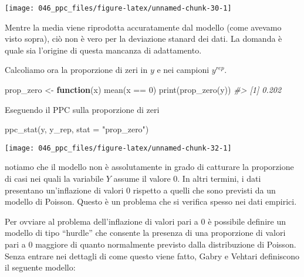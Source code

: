 \documentclass[
]{memoir}
\newenvironment{Shaded}{\begin{snugshade}}{\end{snugshade}}
\newcommand{\AttributeTok}[1]{\textcolor[rgb]{0.77,0.63,0.00}{#1}}
\newcommand{\CommentTok}[1]{\textcolor[rgb]{0.56,0.35,0.01}{\textit{#1}}}
\newcommand{\ControlFlowTok}[1]{\textcolor[rgb]{0.13,0.29,0.53}{\textbf{#1}}}
\newcommand{\DecValTok}[1]{\textcolor[rgb]{0.00,0.00,0.81}{#1}}
\newcommand{\FunctionTok}[1]{\textcolor[rgb]{0.00,0.00,0.00}{#1}}
\newcommand{\NormalTok}[1]{#1}
\newcommand{\OtherTok}[1]{\textcolor[rgb]{0.56,0.35,0.01}{#1}}
\newcommand{\SpecialCharTok}[1]{\textcolor[rgb]{0.00,0.00,0.00}{#1}}
\newcommand{\StringTok}[1]{\textcolor[rgb]{0.31,0.60,0.02}{#1}}
\theoremstyle{definition}
\theoremstyle{definition}
\theoremstyle{definition}
\theoremstyle{definition}
\theoremstyle{remark}
\begin{document}
\begin{center}\texttt{[image: 046\_ppc\_files/figure-latex/unnamed-chunk-30-1]} \end{center}

\noindent
Mentre la media viene riprodotta accuratamente dal modello (come avevamo visto sopra), ciò non è vero per la deviazione stanard dei dati. La domanda è quale sia l'origine di questa mancanza di adattamento.

Calcoliamo ora la proporzione di zeri in \(y\) e nei campioni \(y^{rep}\).

\begin{Shaded}
\begin{Highlighting}[]
\NormalTok{prop\_zero }\OtherTok{\textless{}{-}} \ControlFlowTok{function}\NormalTok{(x) }\FunctionTok{mean}\NormalTok{(x }\SpecialCharTok{==} \DecValTok{0}\NormalTok{)}
\FunctionTok{print}\NormalTok{(}\FunctionTok{prop\_zero}\NormalTok{(y))}
\CommentTok{\#\textgreater{} [1] 0.202}
\end{Highlighting}
\end{Shaded}

Eseguendo il PPC sulla proporzione di zeri

\begin{Shaded}
\begin{Highlighting}[]
\FunctionTok{ppc\_stat}\NormalTok{(y, y\_rep, }\AttributeTok{stat =} \StringTok{"prop\_zero"}\NormalTok{)}
\end{Highlighting}
\end{Shaded}

\begin{center}\texttt{[image: 046\_ppc\_files/figure-latex/unnamed-chunk-32-1]} \end{center}

\noindent 
notiamo che il modello non è assolutamente in grado di catturare la proporzione di casi nei quali la variabile \(Y\) assume il valore 0. In altri termini, i dati presentano un'inflazione di valori 0 rispetto a quelli che sono previsti da un modello di Poisson. Questo è un problema che si verifica spesso nei dati empirici.

Per ovviare al problema dell'inflazione di valori pari a 0 è possibile definire un modello di tipo ``hurdle'' che consente la presenza di una proporzione di valori pari a 0 maggiore di quanto normalmente previsto dalla distribuzione di Poisson. Senza entrare nei dettagli di come questo viene fatto, Gabry e Vehtari definiscono il seguente modello:
\end{document}
